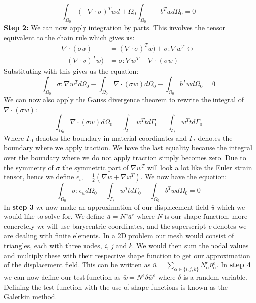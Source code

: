 \begin{equation*}
	\int_{\Omega_0} (- \nabla \cdot \sigma)^Twd + \Omega_0 \int_{\Omega_0}-b^T wd\Omega_0 = 0
\end{equation*}
\textbf{Step 2:} We can now apply integration by parts. This involves the tensor equivalent to the chain rule which gives us:
\begin{align*}
	\nabla \cdot (\sigma w) &= (\nabla\cdot \sigma)^T w) + \sigma : \nabla w^T \leftrightarrow\\
	-(\nabla\cdot \sigma)^T w) &= \sigma : \nabla w^T - \nabla \cdot (\sigma w)
\end{align*}
Substituting with this gives us the equation:
\begin{equation*}
	\int_{\Omega_0}  \sigma : \nabla w^Td\Omega_0 - \int_{\Omega_0} \nabla \cdot (\sigma w)d\Omega_0 - \int_{\Omega_0}b^T wd\Omega_0 = 0
\end{equation*}
We can now also apply the Gauss divergence theorem to rewrite the integral of $\nabla \cdot (\sigma w)$:
\begin{equation*}
	\int_{\Omega_0} \nabla \cdot (\sigma w)d\Omega_0 = \int_{\Gamma_0} w^Ttd\Gamma_0 = \int_{\Gamma_t} w^Ttd\Gamma_0 
\end{equation*}
Where $\Gamma_0$ denotes the boundary in material coordinates and $\Gamma_t$ denotes the boundary where we apply traction. We have the last equality because the integral over the boundary where we do not apply traction simply becomes zero. Due to the symmetry of $\sigma$ the symmetric part of $ \nabla w^T$ will look a lot like the Euler strain tensor, hence we define $\epsilon_w = \frac{1}{2}(\nabla w + \nabla w^T)$. We now have the equation:
\begin{equation*}
	\int_{\Omega_0}  \sigma :\epsilon_wd\Omega_0 - \int_{\Gamma_t} w^Ttd\Gamma_0  - \int_{\Omega_0}b^T wd\Omega_0 = 0 
\end{equation*}
In \textbf{step 3} we now make an approximation of our displacement field $\bar{u}$ which we would like to solve for. We define $\bar{u} = N^e \bar{u}^e$ where \textit{N} is our shape function, more concretely we will use barycentric coordinates, and the superscript \textit{e} denotes we are dealing with finite elements. In a 2D problem our mesh would consist of triangles, each with three nodes, \textit{i, j} and \textit{k}. We would then sum the nodal values and multiply these with their respective shape function to get our approximation of the displacement field. This can be written as $\bar{u} = \sum_{\alpha \in \{i,j,k\}} N_\alpha^e \bar{u}_\alpha^e$. In \textbf{step 4} we can now define our test function as $\bar{w} = N^e\delta \bar{w}^e$ where $\delta$ is a random variable. Defining the test function with the use of shape functions is known as the Galerkin method. \\

